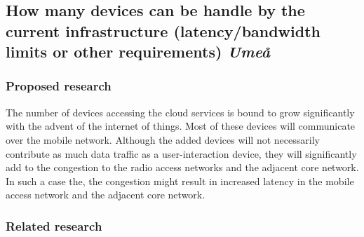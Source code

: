\subsection{How many devices can be handle by the current infrastructure (latency/bandwidth limits or other requirements) \emph{Umeå} }
\subsubsection{Proposed research}
The number of devices accessing the cloud services is bound to grow significantly with the advent of the internet of things. Most of these devices will communicate over the mobile network. Although the added devices will not necessarily contribute as much data traffic as a user-interaction device, they will significantly add to the congestion to the radio access networks and the adjacent core network. In such a case the, the congestion might result in increased latency in the mobile access network and the adjacent core network.
\subsubsection{Related research}